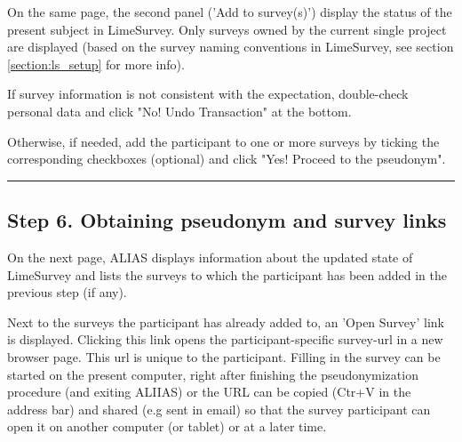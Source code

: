 On the same page, the second panel ('Add to survey(s)') display the status of the present subject in LimeSurvey. Only surveys owned by the current single project are displayed (based on the survey naming conventions in LimeSurvey, see section \ref{section:ls_setup} for more info).

\small\setlength\fboxsep{5pt}\setlength\fboxrule{1pt}

If survey information is not consistent with the expectation, double-check personal data and click "No! Undo Transaction" at the bottom.

Otherwise, if needed, add the participant to one or more surveys by ticking the corresponding checkboxes (optional) and click "Yes! Proceed to the pseudonym".

\small\setlength\fboxsep{5pt}\setlength\fboxrule{1pt}

\par\noindent\rule{\textwidth\color{pniblue}}{0.4pt}
\subsection*{Step 6. Obtaining pseudonym and survey links}

On the next page, ALIAS displays information about the updated state of LimeSurvey and lists the surveys to which the participant has been added in the previous step (if any).

Next to the surveys the participant has already added to, an 'Open Survey' link is displayed. Clicking this link opens the participant-specific survey-url in a new browser page. This url is unique to the participant. Filling in the survey can be started on the present computer, right after finishing the pseudonymization procedure (and exiting ALIIAS) or the URL can be copied (Ctr+V in the address bar) and shared (e.g sent in email) so that the survey participant can open it on another computer (or tablet) or at a later time.


